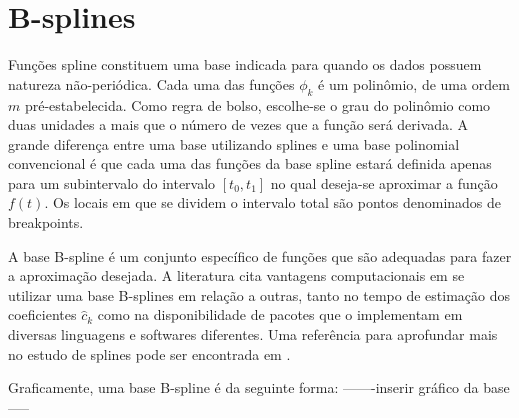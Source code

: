 \documentclass{article}
\title{}
\author{}
\date{\today}
\begin{document}
\maketitle

\section{B-splines}

Funções spline constituem uma base indicada para quando os dados possuem natureza não-periódica. 
Cada uma das funções $\phi_k$ é um polinômio, de uma ordem $m$ pré-estabelecida. 
Como regra de bolso, escolhe-se o grau do polinômio como duas unidades a mais que o número de vezes que a função será derivada.
A grande diferença entre uma base utilizando splines e uma base polinomial convencional é que cada uma das funções da base spline estará definida apenas para um subintervalo do intervalo $[t_0,t_1]$ no qual  deseja-se aproximar a função $f(t)$.
Os locais em que se dividem o intervalo total são pontos denominados de breakpoints.

A base B-spline é um conjunto específico de funções que são adequadas para fazer a aproximação desejada.
A literatura cita vantagens computacionais em se utilizar uma base B-splines em relação a outras, tanto no tempo de estimação dos coeficientes $\hat{c}_k$ como na disponibilidade de pacotes que o implementam em diversas linguagens e softwares diferentes.
Uma referência para aprofundar mais no estudo de splines pode ser encontrada em .

Graficamente, uma base B-spline é da seguinte forma:
-------inserir gráfico da base-----


\section{}

\section{}
\end{document}

